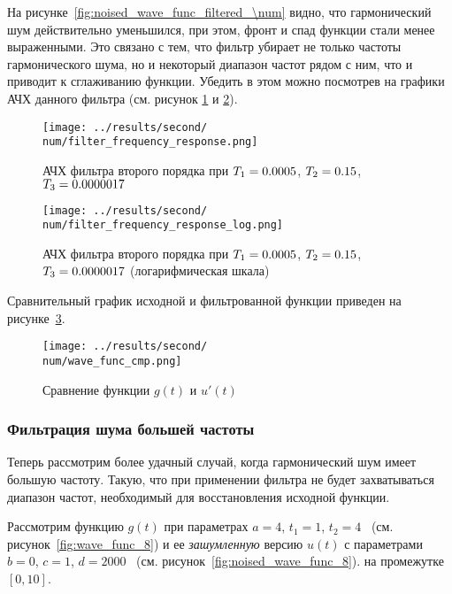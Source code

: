 На рисунке~\ref{fig:noised_wave_func_filtered_\num} видно, что гармонический шум действительно уменьшился, при этом,
фронт и спад функции стали менее выраженными. Это связано с тем, что фильтр убирает не только частоты гармонического шума,
но и некоторый диапазон частот рядом с ним, что и приводит к сглаживанию функции.
Убедить в этом можно посмотрев на графики АЧХ данного фильтра (см. рисунок \ref{fig:filter_frequency_response_\num} и \ref{fig:filter_frequency_response_log_\num}).

\begin{figure}[ht!]
    \centering
    \texttt{[image: ../results/second/\\num/filter\_frequency\_response.png]}
    \caption{АЧХ фильтра второго порядка при $T_1 = \Tf$, $T_2 = \Ts$, $T_3 = \Tt$}
    \label{fig:filter_frequency_response_\num}
\end{figure}

\begin{figure}[ht!]
    \centering
    \texttt{[image: ../results/second/\\num/filter\_frequency\_response\_log.png]}
    \caption{АЧХ фильтра второго порядка при $T_1 = \Tf$, $T_2 = \Ts$, $T_3 = \Tt$ (логарифмическая шкала)}
    \label{fig:filter_frequency_response_log_\num}
\end{figure}

Сравнительный график исходной и фильтрованной функции приведен на рисунке~\ref{fig:wave_func_cmp_\num}.
\begin{figure}[ht!]
    \centering
    \texttt{[image: ../results/second/\\num/wave\_func\_cmp.png]}
    \caption{Сравнение функции $g(t)$ и $u'(t)$}
    \label{fig:wave_func_cmp_\num}
\end{figure}

\FloatBarrier
\subsubsection{Фильтрация шума большей частоты}

\def\num{8}
\def\a{4}
\def\from{1}
\def\to{4}
\def\b{0}
\def\c{1}
\def\d{2000}
\def\L{10}
\def\A{300}
\def\Wz{2000}
\def\Tf{\fpeval{round(1 / \Wz, 7)}}
\def\Ts{\fpeval{round(\A / \Wz, 7)}}
\def\Tt{\fpeval{round(1 / (\A * \Wz), 7)}}

Теперь рассмотрим более удачный случай, когда гармонический шум имеет большую частоту. Такую, что
при применении фильтра не будет захватываться диапазон частот, необходимый для восстановления исходной функции.

Рассмотрим функцию $g(t)$ при параметрах $a=\a$, $t_1 = \from$, $t_2 = \to$ ~(см. рисунок~\ref{fig:wave_func_\num}) 
и ее \textit{зашумленную} версию $u(t)$ с параметрами $b = \b$, $c = \c$, $d = \d$ ~(см. рисунок~\ref{fig:noised_wave_func_\num}).
на промежутке $[0,\L]$. 

